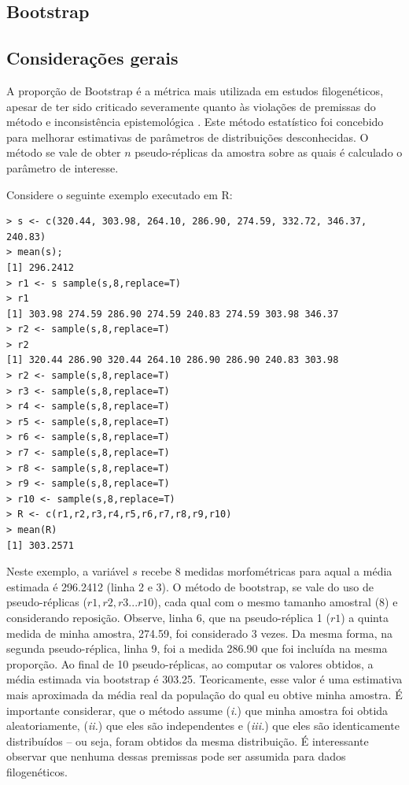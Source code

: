 \begin{refsection}
\section{Bootstrap}\label{tut14:boots}

\subsection{Considerações gerais}\label{tut14:boots:general}

A proporção de Bootstrap é a métrica mais utilizada em estudos filogenéticos, apesar de ter sido criticado severamente quanto às violações de premissas do método \parencite[veja][; e referências citadas]{Siddall_2001, Wheeler_2012} e inconsistência epistemológica \parencite[][]{Wheeler_2012}. Este método estatístico foi concebido para melhorar estimativas de parâmetros de distribuições desconhecidas. O método se vale de obter $n$ pseudo-réplicas da amostra sobre as quais é calculado o parâmetro de interesse. 

Considere o seguinte exemplo executado em R:

\begin{lstlisting}[label=tut14:bs]
> s <- c(320.44, 303.98, 264.10, 286.90, 274.59, 332.72, 346.37, 240.83)
> mean(s);
[1] 296.2412
> r1 <- s sample(s,8,replace=T)
> r1
[1] 303.98 274.59 286.90 274.59 240.83 274.59 303.98 346.37
> r2 <- sample(s,8,replace=T)
> r2
[1] 320.44 286.90 320.44 264.10 286.90 286.90 240.83 303.98
> r2 <- sample(s,8,replace=T)
> r3 <- sample(s,8,replace=T)
> r4 <- sample(s,8,replace=T)
> r5 <- sample(s,8,replace=T)
> r6 <- sample(s,8,replace=T)
> r7 <- sample(s,8,replace=T)
> r8 <- sample(s,8,replace=T)
> r9 <- sample(s,8,replace=T)
> r10 <- sample(s,8,replace=T)
> R <- c(r1,r2,r3,r4,r5,r6,r7,r8,r9,r10)
> mean(R)
[1] 303.2571
\end{lstlisting}


Neste exemplo, a variável $s$ recebe 8 medidas morfométricas para aqual a média estimada é 296.2412 (linha 2 e 3). O método de bootstrap, se vale do uso de pseudo-réplicas ($r1, r2, r3 ... r10$), cada qual com o mesmo tamanho amostral (8) e considerando reposição. Observe, linha 6, que na pseudo-réplica 1 ($r1$) a quinta medida de minha amostra, 274.59, foi considerado 3 vezes. Da mesma forma, na segunda pseudo-réplica, linha 9, foi a medida 286.90 que foi incluída na mesma proporção. Ao final de 10 pseudo-réplicas, ao computar os valores obtidos, a média estimada via bootstrap é 303.25. Teoricamente, esse valor é uma estimativa mais aproximada da média real da população do qual eu obtive minha amostra. É importante considerar, que o método assume (\textit{i.}) que minha amostra foi obtida aleatoriamente, (\textit{ii.}) que eles são independentes e (\textit{iii.}) que eles são identicamente distribuídos -- ou seja, foram obtidos da mesma distribuição. É interessante observar que nenhuma dessas premissas pode ser assumida para dados filogenéticos.


\end{refsection}
